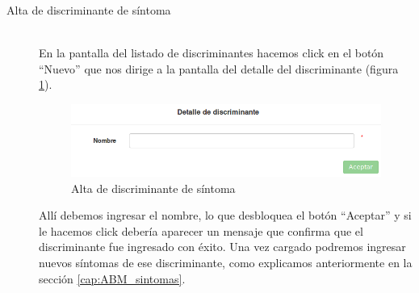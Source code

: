 \begin{description}
\item[Alta de discriminante de síntoma] \mbox{} \\
En la pantalla del listado de discriminantes hacemos click en el botón ``Nuevo'' que nos dirige a la pantalla del detalle del discriminante (figura \ref{fig:nuevo_discriminante}).
\begin{figure}
\centerline{\includegraphics[width=1\textwidth]{nuevo_discriminante.png}}
\caption{Alta de discriminante de síntoma}
\label{fig:nuevo_discriminante}
\end{figure}
Allí debemos ingresar el nombre, lo que desbloquea el botón ``Aceptar'' y si le hacemos click debería aparecer un mensaje que confirma que el discriminante fue ingresado con éxito. Una vez cargado podremos ingresar nuevos síntomas de ese discriminante, como explicamos anteriormente en la sección \ref{cap:ABM_sintomas}.


\end{description}
